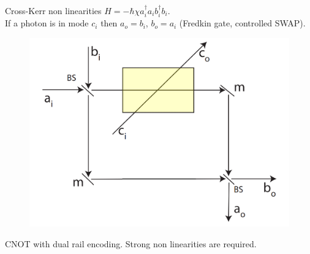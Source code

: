\documentclass{beamer}
\begin{document}
\begin{frame}
\begin{center}
Cross-Kerr non linearities $H = - \hbar \chi a_i^{\dagger} a_i b_i^{\dagger} b_i$.\\
If a photon is in mode $c_i$ then $a_o = b_i$, $b_o = a_i$ (Fredkin gate, controlled SWAP).

\begin{figure}[!htb]
\centering
\includegraphics[scale=.17]{immagini/CrossKerr.png}
\end{figure}

CNOT with dual rail encoding. Strong non linearities are required.
\end{center}
\end{frame}
\end{document}
